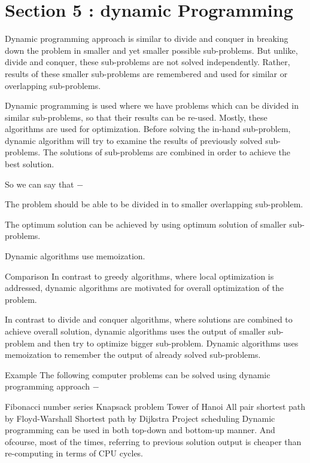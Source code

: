 \section{Section 5 : dynamic Programming}
\begin{frame}

Dynamic programming approach is similar to divide and conquer in breaking down the problem in smaller and yet smaller possible sub-problems. But unlike, divide and conquer, these sub-problems are not solved independently. Rather, results of these smaller sub-problems are remembered and used for similar or overlapping sub-problems.

Dynamic programming is used where we have problems which can be divided in similar sub-problems, so that their results can be re-used. Mostly, these algorithms are used for optimization. Before solving the in-hand sub-problem, dynamic algorithm will try to examine the results of previously solved sub-problems. The solutions of sub-problems are combined in order to achieve the best solution.

So we can say that −

The problem should be able to be divided in to smaller overlapping sub-problem.

The optimum solution can be achieved by using optimum solution of smaller sub-problems.

Dynamic algorithms use memoization.

Comparison
In contrast to greedy algorithms, where local optimization is addressed, dynamic algorithms are motivated for overall optimization of the problem.

In contrast to divide and conquer algorithms, where solutions are combined to achieve overall solution, dynamic algorithms uses the output of smaller sub-problem and then try to optimize bigger sub-problem. Dynamic algorithms uses memoization to remember the output of already solved sub-problems.

Example
The following computer problems can be solved using dynamic programming approach −

Fibonacci number series
Knapsack problem
Tower of Hanoi
All pair shortest path by Floyd-Warshall
Shortest path by Dijkstra
Project scheduling
Dynamic programming can be used in both top-down and bottom-up manner. And ofcourse, most of the times, referring to previous solution output is cheaper than re-computing in terms of CPU cycles.
 
\end{frame}
